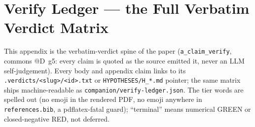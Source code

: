 \section{Verify Ledger --- the Full Verbatim Verdict Matrix}
\label{app:verify_ledger}

This appendix is the verbatim-verdict spine of the paper (\texttt{a\_claim\_verify},
commons @D~g5: every claim is quoted as the source emitted it, never an LLM
self-judgement). Every body and appendix claim links to its
\texttt{.verdicts/<slug>/<id>.txt} or \texttt{HYPOTHESES/H\_*.md} pointer; the same
matrix ships machine-readable as \texttt{companion/verify-ledger.json}. The tier
words are spelled out (no emoji in the rendered PDF, no emoji anywhere in
\texttt{references.bib}, a pdflatex-fatal guard); ``terminal'' means numerical
GREEN or closed-negative RED, not deferred.

